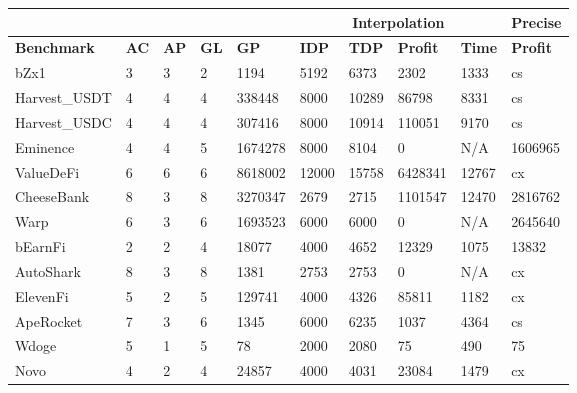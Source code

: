 \begin{table}[]
\begin{tabular}{|l|llll|llll|l|}
    \hline
\multicolumn{5}{|l|}{}                              & \multicolumn{4}{c|}{\textbf{Interpolation}}      & \textbf{Precise} \\ \hline
\textbf{Benchmark}     & \textbf{AC} & \textbf{AP} & \textbf{GL} & \textbf{GP}   & \textbf{IDP} & \textbf{TDP}  & \textbf{Profit}  & \textbf{Time} & \textbf{Profit}  \\
bZx1          & 3  & 3  & 2  & 1194                         & 5192            & 6373           & 2302         & 1333       & cs      \\
Harvest\_USDT & 4  & 4  & 4  & 338448                       & 8000            & 10289          & 86798        & 8331       & cs      \\
Harvest\_USDC & 4  & 4  & 4  & 307416                       & 8000            & 10914          & 110051       & 9170       & cs      \\
Eminence      & 4  & 4  & 5  & 1674278                      & 8000            & 8104           & 0            & N/A        & 1606965 \\
ValueDeFi     & 6  & 6  & 6  & 8618002                      & 12000           & 15758          & 6428341      & 12767      & cx       \\
CheeseBank    & 8  & 3  & 8  & 3270347                      & 2679            & 2715           & 1101547      & 12470      & 2816762 \\
Warp          & 6  & 3  & 6  & 1693523                      & 6000            & 6000           & 0            & N/A        & 2645640 \\
bEarnFi       & 2  & 2  & 4  & 18077                        & 4000            & 4652           & 12329        & 1075       & 13832   \\
AutoShark     & 8  & 3  & 8  & 1381                         & 2753            & 2753           & 0            & N/A        & cx       \\
ElevenFi      & 5  & 2  & 5  & 129741                       & 4000            & 4326           & 85811        & 1182       & cx       \\ 
ApeRocket     & 7  & 3  & 6  & 1345                         & 6000            & 6235           & 1037         & 4364       & cs      \\ 
Wdoge         & 5  & 1  & 5  & 78                           & 2000            & 2080           & 75           & 490        & 75      \\ 
Novo          & 4  & 2  & 4  & 24857                        & 4000            & 4031           & 23084        & 1479       & cx       \\

\end{tabular}
\end{table}
